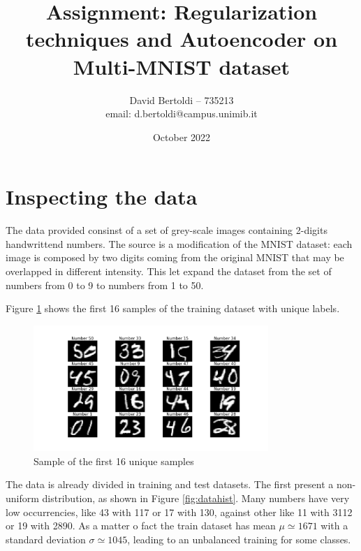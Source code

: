 \documentclass[compsoc]{IEEEtran}
\title{Assignment: Regularization techniques and Autoencoder on Multi-MNIST dataset}
\author{David Bertoldi -- 735213 \\ email: d.bertoldi@campus.unimib.it}
\affil{Department of Informatics, Systems and Communication}
\affil{University of Milano-Bicocca}
\date{October 2022}
\begin{document}
\maketitle 

\section{Inspecting the data}
The data provided consinst of a set of grey-scale images containing 2-digits handwrittend numbers.
The source is a modification of the MNIST dataset: each image is composed by two digits coming from
the original MNIST that may be overlapped in different intensity. This let expand the dataset from
the set of numbers from 0 to 9 to numbers from 1 to 50. \par

Figure \ref{fig:sample} shows the first 16 samples of the training dataset with unique labels.

\begin{figure}[ht!]
\centering                                                                        
\includegraphics[width=3.5in]{sample.png}
\captionsetup{justification=centering}                                                                                                                                   
\caption{Sample of the first 16 unique samples}
\label{fig:sample}
\end{figure}

The data is already divided in training and test datasets. The first present a non-uniform distribution,
as shown in Figure \ref{fig:datahist}. 
Many numbers have very low occurrencies, like 43 with 117 or 17 with 130, against other like 11 with 3112 or 19 with 2890.
As a matter o fact the train dataset has mean $\mu\simeq 1671$ with a standard deviation $\sigma\simeq 1045$, leading to
an unbalanced training for some classes.
\end{document}
